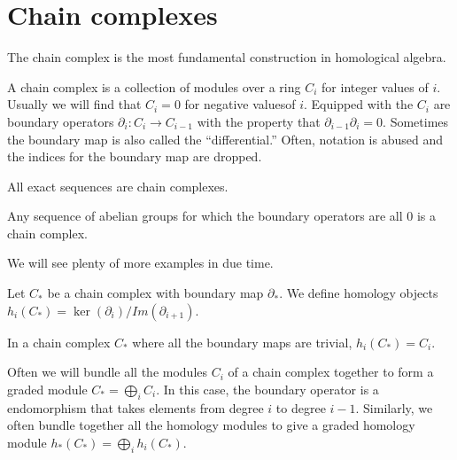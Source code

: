\section{Chain complexes}
The chain complex is the most fundamental construction in homological algebra.
\begin{definition} A chain complex is a collection of modules over a ring $C_i$
for integer values of $i$. Usually we will find that $C_i=0$ for negative valuesof $i$. Equipped with the $C_i$ are boundary operators
$\partial_i:C_i\rightarrow C_{i-1}$ with the property that
$\partial_{i-1}\partial_i=0$. Sometimes the boundary map is also called the
``differential.'' Often, notation is abused and the indices for the boundary map are dropped.\end{definition}
\begin{example} All exact sequences are chain complexes. \end{example}
\begin{example} Any sequence of abelian groups for which the boundary operators
are all $0$ is a chain complex. \end{example}
We will see plenty of more examples in due time. 
\begin{definition} Let $C_*$ be a chain complex with boundary map $\partial_*$.
We define homology objects $h_i(C_*)=\ker(\partial_i)/Im(\partial_{i+1})$.
\end{definition}
\begin{example} In a chain complex $C_*$ where all the boundary maps are
trivial, $h_i(C_*)=C_i$. \end{example}

Often we will bundle all the modules $C_i$ of a chain complex together to form a graded module $C_*=\bigoplus_i C_i$. In this case, the boundary operator is a
endomorphism that takes elements from degree $i$ to degree $i-1$. Similarly, we
often bundle together all the homology modules to give a graded homology module
$h_*(C_*)=\bigoplus_i h_i(C_*)$.

